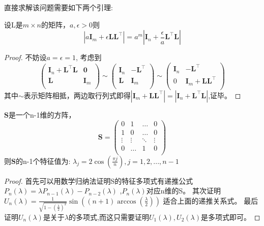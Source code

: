 直接求解该问题需要如下两个引理:
\begin{lemma}\label{lemma:change}
设L是$m\times n$的矩阵，$a,\epsilon > 0$则
\begin{equation}
|a\bm{I}_m+\epsilon \bm{L}\bm{L}^\intercal |=a^m|\bm{I}_n+\frac{\epsilon}{a} \bm{L}^\intercal \bm{L}|
\end{equation}
\end{lemma}
\begin{proof}
不妨设$a=\epsilon=1$,
考虑到
\[
\left(\begin{array}{cc}
\bm{I}_n+\bm{L}^\intercal \bm{L}&\bm{0}\\
\bm{L}&\bm{I}_m\\
\end{array}\right)\sim\left(\begin{array}{cc}
\bm{I}_n&-\bm{L}^\intercal \\
\bm{L}&\bm{I}_m\\
\end{array}\right)\sim\left(\begin{array}{cc}
\bm{I}_n&-\bm{L}^\intercal \\
0&\bm{I}_m+\bm{L}\bm{L}^\intercal \\
\end{array}\right)
\]
其中$\sim$表示矩阵相抵，两边取行列式即得$|\bm{I}_m+\bm{L}\bm{L}^\intercal |=|\bm{I}_n+\bm{L}^\intercal \bm{L}|$,证毕。
\end{proof}


\begin{lemma}\label{lemma:special}
$\bm{S}$是一个n-1维的方阵，\[
\bm{S}=\left(
\begin{array}{cccc}
0&1&\dots&0\\
1&0&\dots&0\\
\vdots&\vdots&\ddots&\vdots\\
0&\dots&1&0\\
\end{array}\right)
\]则$\bm{S}$的n-1个特征值为:
$\lambda_j=2\cos(\frac{\pi j}{n}),j=1,2,...,n-1$
\end{lemma}
\begin{proof}
首先可以用数学归纳法证明S的特征多项式有递推公式$P_n(\lambda)=\lambda P_{n-1}(\lambda)-P_{n-2}(\lambda)$
,$P_n(\lambda)$对应n维的S。
其次证明
$U_n(\lambda)=\frac{1}{\sqrt{1-(\frac{\lambda}{2})^2}}\sin((n+1)\arccos(\frac{\lambda}{2}))
$
适合上面的递推关系式。
最后证明$U_n(\lambda)$是关于$\lambda$的多项式,而这只需要证明$U_1(\lambda),U_2(\lambda)$是多项式即可。
\end{proof}

